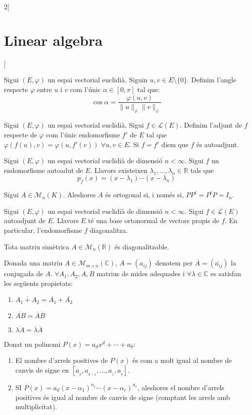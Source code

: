\documentclass[class=article,10pt,crop=false]{standalone}
\begin{document}
\begin{multicols}{2}[\section{Linear algebra}]
\begin{definition}
Sigui $(E,\varphi)$ un espai vectorial euclidià. Siguin $u,v\in E\setminus\{0\}$. Definim l'angle respecte $\varphi$ entre $u$ i $v$ com l'únic $\alpha\in[0,\pi]$ tal que: $$\cos{\alpha}=\frac{\varphi(u,v)}{\|u\|_\varphi\|v\|_\varphi}$$
\end{definition}
\begin{definition}
Sigui $(E,\varphi)$ un espai vectorial euclidià. Sigui $f\in\mathcal{L}(E)$. Definim l'adjunt de $f$ respecte de $\varphi$ com l'únic endomorfisme $f'$ de $E$ tal que $\varphi(f(u),v)=\varphi(u,f'(v))$ $\forall u,v\in E$. Si $f=f'$ diem que $f$ és autoadjunt. 
\end{definition}
\begin{lemma}
Sigui $(E,\varphi)$ un espai vectorial euclidià de dimensió $n<\infty$. Sigui $f$ un endomorfisme autoadut de $E$. Llavors existeixen $\lambda_1,\ldots,\lambda_n\in\mathbb{R}$ tals que $$p_f(x)=(x-\lambda_1 )\cdots(x-\lambda_n)$$
\end{lemma}
\begin{definition}
Sigui $A\in\mathcal{M}_n(K)$. Aleshores $A$ és ortogonal si, i només si, $PP^t=P^tP=I_n$.
\end{definition}
\begin{theorem}
Sigui $(E,\varphi)$ un espai vectorial euclidià de dimensió $n<\infty$. Sigui $f\in\mathcal{L}(E)$ autoadjunt de $E$. Llavors $E$ té una base ortonormal de vectors propis de $f$. En particular, l’endomorfisme $f$ diagonalitza.
\end{theorem}
\begin{corollary}
Tota matriu simètrica $A\in\mathcal{M}_n(\mathbb{R})$ és diagonalitzable.
\end{corollary}
\begin{definition}
Donada una matriu $A\in\mathcal{M}_{m\times n}(\mathbb{C})$, $A=(a_{ij})$ denotem per $\overline{A}=(\overline{a_{ij}})$ la conjugada de $A$. $\forall A_1,A_2,A,B$ matrius de mides adequades i $\forall\lambda\in\mathbb{C}$ es satisfan les següents propietats:
\begin{enumerate}
    \item $\overline{A_1+A_2}=\overline{
    A_1}+\overline{A_2}$
    \item $\overline{AB}=\overline{
    A}\overline{B}$
    \item $\overline{\lambda A}=\overline{\lambda}\overline{A}$
\end{enumerate}
\end{definition}
\begin{theorem}
Donat un polinomi $P(x)=a_dx^d+\cdots+a_0$:
\begin{enumerate}
    \item El nombre d'arrels positives de $P(x)$ és com a molt igual al nombre de canvis de signe en $[a_{\!_d},a_{\!_{d-1}},\ldots,a_{\!_1},a_{\!_0}]$.
    \item SI $P(x)=a_d(x-\alpha_1)^{n_1}\cdots(x-\alpha_r)^{n_r}$, aleshores el nombre d'arrels positives és igual al nombre de canvis de signe (comptant les arrels amb multiplicitat).
\end{enumerate}
\end{theorem}
\end{multicols}
\end{document}

